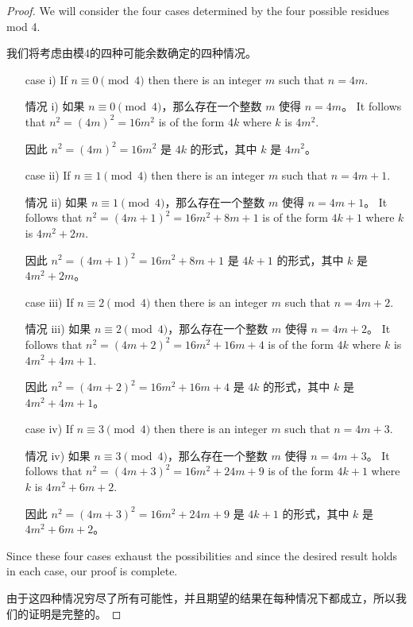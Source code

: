 \begin{proof}
We will consider the four cases determined by the four
possible residues mod 4.

我们将考虑由模4的四种可能余数确定的四种情况。

\begin{itemize}
\item[case i)] If $n \equiv 0 \pmod{4}$ then there is an integer $m$
such that $n = 4m$.

情况 i) 如果 $n \equiv 0 \pmod{4}$，那么存在一个整数 $m$ 使得 $n = 4m$。
It follows that $n^2 = (4m)^2 = 16m^2$ is of the 
form $4k$ where $k$ is $4m^2$.

因此 $n^2 = (4m)^2 = 16m^2$ 是 $4k$ 的形式，其中 $k$ 是 $4m^2$。
\item[case ii)] If $n \equiv 1 \pmod{4}$ then there is an integer $m$
such that $n = 4m+1$.

情况 ii) 如果 $n \equiv 1 \pmod{4}$，那么存在一个整数 $m$ 使得 $n = 4m+1$。
It follows that $n^2 = (4m+1)^2 = 16m^2 + 8m + 1$ 
is of the form $4k+1$ where $k$ is $4m^2+2m$.

因此 $n^2 = (4m+1)^2 = 16m^2 + 8m + 1$ 是 $4k+1$ 的形式，其中 $k$ 是 $4m^2+2m$。
\item[case iii)] If $n \equiv 2 \pmod{4}$ then there is an integer $m$
such that $n = 4m+2$.

情况 iii) 如果 $n \equiv 2 \pmod{4}$，那么存在一个整数 $m$ 使得 $n = 4m+2$。
It follows that $n^2 = (4m+2)^2 = 16m^2 + 16m + 4$ 
is of the form $4k$ where $k$ is $4m^2+4m+1$.

因此 $n^2 = (4m+2)^2 = 16m^2 + 16m + 4$ 是 $4k$ 的形式，其中 $k$ 是 $4m^2+4m+1$。
\item[case iv)] If $n \equiv 3 \pmod{4}$ then there is an integer $m$
such that $n = 4m+3$.

情况 iv) 如果 $n \equiv 3 \pmod{4}$，那么存在一个整数 $m$ 使得 $n = 4m+3$。
It follows that $n^2 = (4m+3)^2 = 16m^2 + 24m + 9$ 
is of the form $4k+1$ where $k$ is $4m^2+6m+2$.

因此 $n^2 = (4m+3)^2 = 16m^2 + 24m + 9$ 是 $4k+1$ 的形式，其中 $k$ 是 $4m^2+6m+2$。
\end{itemize}

Since these four cases exhaust the possibilities and since the desired
result holds in each case, our proof is complete.

由于这四种情况穷尽了所有可能性，并且期望的结果在每种情况下都成立，所以我们的证明是完整的。
\end{proof} 


